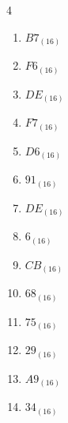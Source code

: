


\setcounter{quesnum}{60}

\begin{multicols}{4}
\begin{enumerate}
  \itemsep=10pt
  \item $B7_{(16)}$

        \phantom{$=183$}

  \item $F6_{(16)}$

        \phantom{$=246$}

  \item $DE_{(16)}$

        \phantom{$=222$}

  \item $F7_{(16)}$

        \phantom{$=247$}

  \item $D6_{(16)}$

        \phantom{$=214$}

  \item $91_{(16)}$

        \phantom{$=145$}

  \item $DE_{(16)}$

        \phantom{$=222$}

  \item $6_{(16)}$

        \phantom{$=6$}

  \item $CB_{(16)}$

        \phantom{$=203$}

  \item $68_{(16)}$

        \phantom{$=104$}

  \item $75_{(16)}$

        \phantom{$=117$}

  \item $29_{(16)}$

        \phantom{$=41$}

  \item $A9_{(16)}$

        \phantom{$=169$}

  \item $34_{(16)}$

        \phantom{$=52$}


\end{enumerate}
\end{multicols}

